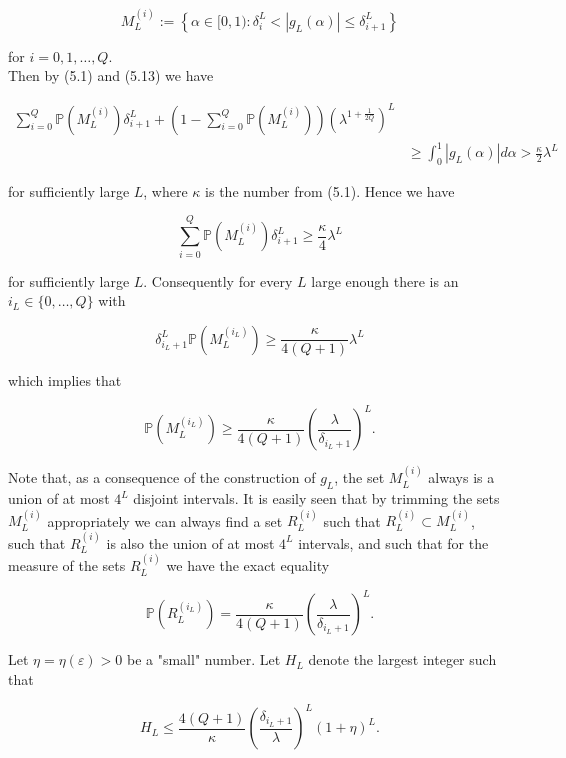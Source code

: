 \documentclass[10pt]{article}
\begin{document}
$$
M_{L}^{(i)}:=\left\{\alpha \in[0,1): \delta_{i}^{L}<\left|g_{L}(\alpha)\right| \leqslant \delta_{i+1}^{L}\right\}
$$

for $i=0,1, \ldots, Q$.\\
Then by (5.1) and (5.13) we have

$$
\begin{aligned}
\sum_{i=0}^{Q} \mathbb{P}\left(M_{L}^{(i)}\right) \delta_{i+1}^{L}+\left(1-\sum_{i=0}^{Q} \mathbb{P}\left(M_{L}^{(i)}\right)\right)\left(\lambda^{1+\frac{1}{2 Q}}\right)^{L} & \\
& \geqslant \int_{0}^{1}\left|g_{L}(\alpha)\right| d \alpha>\frac{\kappa}{2} \lambda^{L}
\end{aligned}
$$

for sufficiently large $L$, where $\kappa$ is the number from (5.1). Hence we have

$$
\sum_{i=0}^{Q} \mathbb{P}\left(M_{L}^{(i)}\right) \delta_{i+1}^{L} \geqslant \frac{\kappa}{4} \lambda^{L}
$$

for sufficiently large $L$. Consequently for every $L$ large enough there is an $i_{L} \in\{0, \ldots, Q\}$ with

$$
\delta_{i_{L}+1}^{L} \mathbb{P}\left(M_{L}^{\left(i_{L}\right)}\right) \geqslant \frac{\kappa}{4(Q+1)} \lambda^{L}
$$

which implies that

$$
\mathbb{P}\left(M_{L}^{\left(i_{L}\right)}\right) \geqslant \frac{\kappa}{4(Q+1)}\left(\frac{\lambda}{\delta_{i_{L}+1}}\right)^{L} .
$$

Note that, as a consequence of the construction of $g_{L}$, the set $M_{L}^{(i)}$ always is a union of at most $4^{L}$ disjoint intervals. It is easily seen that by trimming the sets $M_{L}^{(i)}$ appropriately we can always find a set $R_{L}^{(i)}$ such that $R_{L}^{(i)} \subset M_{L}^{(i)}$,\\
such that $R_{L}^{(i)}$ is also the union of at most $4^{L}$ intervals, and such that for the measure of the sets $R_{L}^{(i)}$ we have the exact equality

$$
\mathbb{P}\left(R_{L}^{\left(i_{L}\right)}\right)=\frac{\kappa}{4(Q+1)}\left(\frac{\lambda}{\delta_{i_{L}+1}}\right)^{L} .
$$

Let $\eta=\eta(\varepsilon)>0$ be a "small" number. Let $H_{L}$ denote the largest integer such that


\begin{equation*}
H_{L} \leqslant \frac{4(Q+1)}{\kappa}\left(\frac{\delta_{i_{L}+1}}{\lambda}\right)^{L}(1+\eta)^{L} . \tag{5.14}
\end{equation*}
\end{document}
